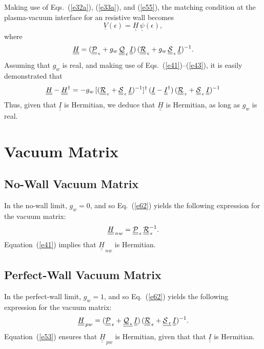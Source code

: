 \documentclass[12pt,prb,aps,notitlepage]{revtex4-1}
\begin{document}
Making use of Eqs.~(\ref{e32a}), (\ref{e33a}), and (\ref{e55}),  the matching condition at the plasma-vacuum interface  for an resistive wall becomes 
\begin{equation}\label{e61}
 \underline{V}(\epsilon)= \underline{\underline{H}}\,\underline{\psi}(\epsilon),
 \end{equation}
 where 
 \begin{equation}\label{e62}
 \underline{\underline{H}}= (\underline{\underline{\cal P}}_{\,\epsilon}+g_w\,\underline{\underline{\cal Q}}_{\,\epsilon}\,\underline{\underline{I}})\,(\underline{\underline{\cal R}}_{\,\epsilon}+g_w\,\underline{\underline{\cal S}}_{\,\epsilon}\,\underline{\underline{I}})^{-1}.
 \end{equation}
 Assuming that $g_w$ is real, and making use of Eqs.~(\ref{e41})--(\ref{e43}),  it is easily demonstrated that
 \begin{equation}
 \underline{\underline{H}}-\underline{\underline{H}}^\dag =-g_w\, [(\underline{\underline{\cal R}}_{\,\epsilon}+\underline{\underline{\cal S}}_{\,\epsilon}\,\underline{\underline{I}})^{-1}]^{\dag}\,(\underline{\underline{I}} -\underline{\underline{I}}^\dag)\,  (\underline{\underline{\cal R}}_{\,\epsilon}+\underline{\underline{\cal S}}_{\,\epsilon}\,\underline{\underline{I}})^{-1}
\end{equation}
Thus, given that $\underline{\underline{I}}$ is Hermitian, we deduce that $\underline{\underline{H}}$ is Hermitian, as long as $g_w$ is real. 
 
\section{Vacuum Matrix}
\subsection{No-Wall Vacuum Matrix}
In the no-wall limit, $g_w=0$, and so Eq.~(\ref{e62}) yields the following expression for the vacuum matrix: 
\begin{equation}\label{e64x}
\underline{\underline{H}}_{\,nw}= \underline{\underline{\cal P}}_{\,\epsilon}\,\underline{\underline{\cal R}}_{\,\epsilon}^{-1}.
\end{equation}
Equation~(\ref{e41}) implies that $\underline{\underline{H}}_{\,nw}$ is Hermitian. 

\subsection{Perfect-Wall Vacuum Matrix}
In the perfect-wall limit, $g_w=1$, and  so Eq.~(\ref{e62}) yields  the following expression for the vacuum matrix: 
\begin{equation}\label{e65x}
\underline{\underline{H}}_{\,pw} = (\underline{\underline{\cal P}}_{\,\epsilon}+\underline{\underline{\cal Q}_{\,\epsilon}}\,\underline{\underline{I}})\,(\underline{\underline{\cal R}}_{\,\epsilon}+\underline{\underline{\cal S}_{\,\epsilon}}\,\underline{\underline{I}})^{-1}.
\end{equation}
Equation~(\ref{e53}) ensures  that $\underline{\underline{H}}_{\,pw}$ is Hermitian, given that that $\underline{\underline{I}}$ is Hermitian.
\end{document}

